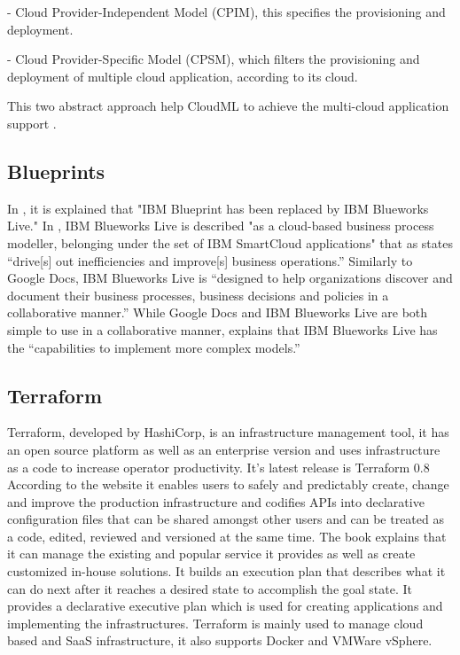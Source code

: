      - Cloud Provider-Independent Model (CPIM), this specifies the
       provisioning and deployment.
       
     - Cloud Provider-Specific Model (CPSM), which filters the
       provisioning and deployment of multiple cloud application,
       according to its cloud.

     This two abstract approach help CloudML to achieve the multi-cloud 
     application support \cite{www-cloudmlwiki}.

\subsection{ Blueprints}

     In \cite{www-blueprints}, it is explained that "IBM Blueprint 
     has been replaced by IBM Blueworks Live." In 
     \cite{www-blueworks-live2}, IBM Blueworks Live is described "as 
     a cloud-based business process modeller, belonging under the set 
     of IBM SmartCloud applications" that as 
     \cite{www-blueworks-live} states ``drive[s] out inefficiencies 
     and improve[s] business operations.'' Similarly to Google Docs, 
     IBM Blueworks Live is ``designed to help organizations discover 
     and document their business processes, business decisions and 
     policies in a collaborative manner.'' While Google Docs and IBM 
     Blueworks Live are both simple to use in a collaborative manner, 
     \cite{www-blueworks-live2} explains that IBM Blueworks Live 
     has the ``capabilities to implement more complex models.''

\subsection{ Terraform}

     Terraform, developed by HashiCorp, is an infrastructure
     management tool, it has an open source platform as well as an
     enterprise version and uses infrastructure as a code to increase
     operator productivity. It’s latest release is Terraform 0.8
     According to the website \cite{www-Terraform} it enables users
     to safely and predictably create, change and improve the
     production infrastructure and codifies APIs into declarative
     configuration files that can be shared amongst other users and
     can be treated as a code, edited, reviewed and versioned at the
     same time. The book \cite{www-terraform-book} explains that it
     can manage the existing and popular service it provides as well
     as create customized in-house solutions. It builds an execution
     plan that describes what it can do next after it reaches a
     desired state to accomplish the goal state. It provides a
     declarative executive plan which is used for creating
     applications and implementing the infrastructures. Terraform is
     mainly used to manage cloud based and SaaS infrastructure, it
     also supports Docker and VMWare vSphere.
     
